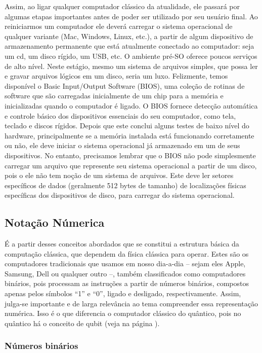 Assim, ao ligar qualquer computador clássico da atualidade, ele passará por algumas etapas importantes antes de poder ser utilizado por seu usuário final. Ao reiniciarmos um computador ele deverá carregar o sistema operacional de qualquer variante (Mac, Windows, Linux, etc.), a partir de algum dispositivo de armazenamento permanente que está atualmente conectado ao computador: seja um cd, um disco rígido, um USB, etc. O ambiente pré-SO oferece poucos serviços de alto nível. Neste estágio, mesmo um sistema de arquivos simples, que possa ler e gravar arquivos lógicos em um disco, seria um luxo. Felizmente, temos disponível o Basic Input/Output Software (BIOS), uma coleção de rotinas de software que são carregadas inicialmente de um chip para a memória e inicializadas quando o computador é ligado. O BIOS fornece detecção automática e controle básico dos dispositivos essenciais do seu computador, como tela, teclado e discos rígidos. Depois que este conclui alguns testes de baixo nível do hardware, principalmente se a memória instalada está funcionando corretamente ou não, ele deve iniciar o sistema operacional já armazenado em um de seus dispositivos. No entanto, precisamos lembrar que o BIOS não pode simplesmente carregar um arquivo que represente seu sistema operacional a partir de um disco, pois o ele não tem noção de um sistema de arquivos. Este deve ler setores específicos de dados (geralmente 512 bytes de tamanho) de localizações físicas específicas dos dispositivos de disco, para carregar do sistema operacional.

\subsection{Notação Númerica}

É a partir desses conceitos abordados que se constitui a estrutura básica da computação clássica, que dependem da física clássica para operar. Estes são os computadores tradicionais que usamos em nosso dia-a-dia – sejam eles Apple, Samsung, Dell ou qualquer outro –, também classificados como computadores binários, pois processam as instruções a partir de números binários, compostos apenas pelos símbolos ``1'' e ``0'', ligado e desligado, respectivamente. Assim, julga-se importante e de larga relevância ao tema compreender essa representação numérica. Isso é o que diferencia o computador clássico do quântico, pois no quântico há o conceito de qubit (veja na página \pageref{qubits}).

\subsubsection{Números binários}

